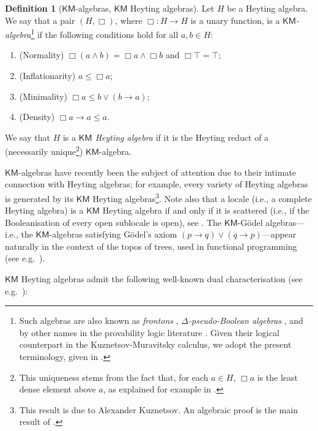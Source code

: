 \documentclass[12pt]{amsart}
\theoremstyle{plain}
\theoremstyle{definition}
\newtheorem{definition}[theorem]{Definition}
\newcommand{\KM}{\mathsf{KM}}
\begin{document}
\begin{definition}[$\KM$-algebras, $\KM$ Heyting algebras] \label{KM-algebra definition}
    Let $H$ be a Heyting algebra. We say that a pair $(H,\Box)$, where $\Box \colon H\to H$ is a unary function, is a \emph{$\KM$-algebra}\footnote{Such algebras are also known as \emph{frontons} \cite{Esakia2006}, \emph{$\Delta$-pseudo-Boolean algebras} \cite{Muravitsky2014}, and by other names in the provability logic literature \cite{Visser1982}. Given their logical counterpart in the Kuznetsov-Muravitsky calculus, we adopt the present terminology, given in \cite[Def.~9]{Muravitsky2014}.}
    if the following conditions hold for all $a,b\in H$:
    \begin{enumerate}
        \item (Normality) $\Box(a\wedge b)=\Box a\wedge \Box b$ and $\Box\top=\top$;
        \item (Inflationarity) $a\leq \Box a$;
        \item (Minimality) $\Box a\leq b\vee (b\rightarrow a)$;
        \item (Density) $\Box a\rightarrow a\leq a$.
    \end{enumerate}
    We say that $H$ is a \emph{$\KM$ Heyting algebra} if it is the Heyting reduct of a (necessarily unique\footnote{This uniqueness stems from the fact that, for each $a\in H$, $\Box a$ is the least dense element above $a$, as explained for example in \cite[Prop.~5]{Esakia2006}.}) $\KM$-algebra. 
\end{definition}

$\KM$-algebras have recently been the subject of attention due to their intimate connection with Heyting algebras; for example, every variety of Heyting algebras is generated by its $\KM$ Heyting algebras\footnote{This result is due to Alexander Kuznetsov. An algebraic proof is the main result of \cite{explicitkuznetsovmuravitsky}.}. Note also that a locale (i.e., a complete Heyting algebra) is a $\KM$ Heyting algebra if and only if it is scattered (i.e., if the Booleanisation of every open sublocale is open), see \cite{Esakia2000}. The $\KM$-Gödel algebras---i.e., the $\KM$-algebras satisfying Gödel's axiom $(p\rightarrow q)\vee (q\rightarrow p)$---appear naturally in the context of the topos of trees, used in functional programming (see e.g.\ \cite{Litak2014}).

$\KM$ Heyting algebras admit the following well-known dual characterisation (see e.g.\ \cite[Prop.~4.8]{CastiglioniSagastumeEtAl2010}):
\end{document}
